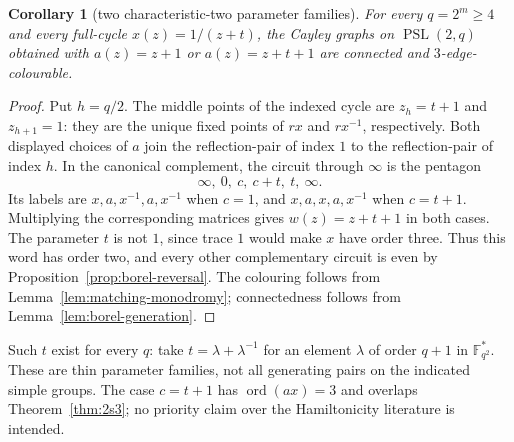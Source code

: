 \documentclass[11pt,a4paper]{article}
\newtheorem{corollary}[theorem]{Corollary}
\theoremstyle{definition}
\theoremstyle{remark}
\newcommand{\ord}{\operatorname{ord}}
\newcommand{\PSL}{\operatorname{PSL}}
\begin{document}
\begin{corollary}[two characteristic-two parameter families]\label{cor:borel-pentagon}
For every $q=2^m\ge4$ and every full-cycle $x(z)=1/(z+t)$, the Cayley graphs on $\PSL(2,q)$ obtained with $a(z)=z+1$ or $a(z)=z+t+1$ are connected and $3$-edge-colourable.
\end{corollary}
\begin{proof}
Put $h=q/2$.  The middle points of the indexed cycle are $z_h=t+1$ and $z_{h+1}=1$: they are the unique fixed points of $rx$ and $rx^{-1}$, respectively.  Both displayed choices of $a$ join the reflection-pair of index $1$ to the reflection-pair of index $h$.  In the canonical complement, the circuit through $\infty$ is the pentagon
\[
 \infty,\ 0,\ c,\ c+t,\ t,\ \infty.
\]
Its labels are $x,a,x^{-1},a,x^{-1}$ when $c=1$, and $x,a,x,a,x^{-1}$ when $c=t+1$.  Multiplying the corresponding matrices gives $w(z)=z+t+1$ in both cases.  The parameter $t$ is not $1$, since trace $1$ would make $x$ have order three.  Thus this word has order two, and every other complementary circuit is even by Proposition~\ref{prop:borel-reversal}.  The colouring follows from Lemma~\ref{lem:matching-monodromy}; connectedness follows from Lemma~\ref{lem:borel-generation}.
\end{proof}
Such $t$ exist for every $q$: take $t=\lambda+\lambda^{-1}$ for an element $\lambda$ of order $q+1$ in $\mathbb F_{q^2}^*$.  These are thin parameter families, not all generating pairs on the indicated simple groups.  The case $c=t+1$ has $\ord(ax)=3$ and overlaps Theorem~\ref{thm:2s3}; no priority claim over the Hamiltonicity literature is intended.
\end{document}
